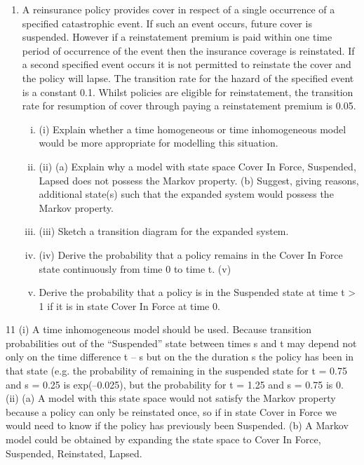 \documentclass[a4paper,12pt]{article}
\begin{document}
\begin{enumerate}

\item A reinsurance policy provides cover in respect of a single occurrence of a specified catastrophic event. If such an event occurs, future cover is suspended. However if a
reinstatement premium is paid within one time period of occurrence of the event then the insurance coverage is reinstated. If a second specified event occurs it is not
permitted to reinstate the cover and the policy will lapse.
The transition rate for the hazard of the specified event is a constant 0.1. Whilst policies are eligible for reinstatement, the transition rate for resumption of cover
through paying a reinstatement premium is 0.05.
\begin{enumerate}[(i)]
\item (i) Explain whether a time homogeneous or time inhomogeneous model would be
more appropriate for modelling this situation.
 
\item (ii) (a)
Explain why a model with state space {Cover In Force, Suspended,
Lapsed} does not possess the Markov property.
(b)
Suggest, giving reasons, additional state(s) such that the expanded
system would possess the Markov property.
 
\item (iii) Sketch a transition diagram for the expanded system.  
\item (iv) Derive the probability that a policy remains in the Cover In Force state
continuously from time 0 to time t.  
(v)
\item Derive the probability that a policy is in the Suspended state at time t > 1 if it
is in state Cover In Force at time 0.
\end{enumerate}
\end{enumerate}
\newpage
11
(i)
A time inhomogeneous model should be used.
Because transition probabilities out of the “Suspended” state between times s and t may depend not only on the time difference t – s but on the
the duration s the policy has been in that state (e.g. the probability of
remaining in the suspended state for t = 0.75 and s = 0.25 is exp(–0.025), but the probability for t = 1.25 and s = 0.75 is 0.
(ii)
(a)
A model with this state space would not satisfy the Markov property because a policy can only be reinstated once,
so if in state Cover in Force we would need to know if the
policy has previously been Suspended.
(b)
A Markov model could be obtained by expanding the state space to {Cover In Force, Suspended, Reinstated, Lapsed}.
\end{document}
